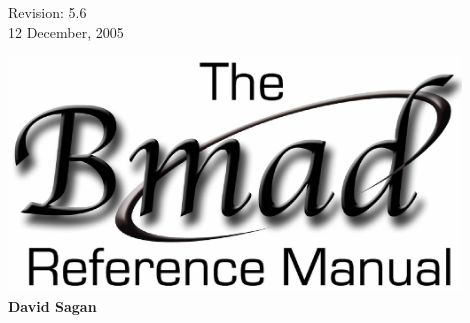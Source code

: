 \thispagestyle{empty}

\begin{flushright}
\large
  Revision: 5.6 \\
  12 December, 2005 \\
\end{flushright}

\vfill

{
\begin{center}
\includegraphics[width=12cm]{bmad_ref_manual.eps} \\
\vskip 0.3in
\huge\bf David Sagan
\end{center}
}

\vfill
\break